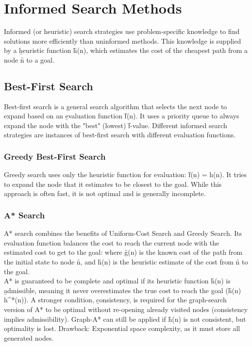 \section{Informed Search Methods}
Informed (or heuristic) search strategies use problem-specific knowledge to find solutions more efficiently than uninformed methods. This knowledge is supplied by a \b{heuristic function} \f{h(n)}, which estimates the cost of the cheapest path from a node \f{n} to a goal.

\subsection{Best-First Search}
Best-first search is a general search algorithm that selects the next node to expand based on an \b{evaluation function} \f{f(n)}. It uses a priority queue to always expand the node with the "best" (lowest) \f{f}-value. Different informed search strategies are instances of best-first search with different evaluation functions.

\subsubsection{Greedy Best-First Search}
Greedy search uses only the heuristic function for evaluation: \f{f(n) = h(n)}. It tries to expand the node that it estimates to be closest to the goal. While this approach is often fast, it is not optimal and is generally incomplete.

\subsubsection{A* Search}
A* search combines the benefits of Uniform-Cost Search and Greedy Search. Its evaluation function balances the cost to reach the current node with the estimated cost to get to the goal: 
where \f{g(n)} is the known cost of the path from the initial state to node \f{n}, and \f{h(n)} is the heuristic estimate of the cost from \f{n} to the goal.\\
A* is guaranteed to be \b{complete and optimal} if its heuristic function \f{h(n)} is \b{admissible}, meaning it never overestimates the true cost to reach the goal (\f{h(n) \le h^*(n)}). A stronger condition, \b{consistency}, is required for the graph-search version of A* to be optimal without re-opening already visited nodes (consistency implies admissibility). Graph-A* can still be applied if \f{h(n)} is not consistent, but optimality is lost. Drawback: Exponential space complexity, as it must store all generated nodes.\\

